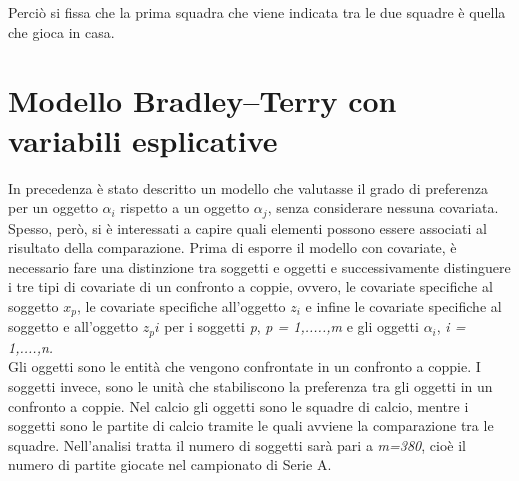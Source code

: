 Perciò si fissa che la prima squadra che viene indicata tra le due squadre è quella che gioca in casa.
\section{Modello Bradley–Terry con variabili esplicative}
In precedenza è stato descritto un modello che valutasse il grado di preferenza per un oggetto $\alpha_{i}$ rispetto a un oggetto $\alpha_{j}$, senza considerare nessuna covariata. Spesso, però, si è interessati a capire quali elementi possono essere associati al risultato della comparazione. Prima di esporre il modello con covariate, è necessario fare una distinzione tra soggetti e oggetti e successivamente distinguere i tre tipi di covariate di un confronto a coppie, ovvero, le covariate specifiche al soggetto $x_p$, le covariate specifiche all'oggetto $z_i$ e infine le covariate specifiche al soggetto e all'oggetto $z_pi$ per i soggetti \emph{p}, \emph{p = 1,.....,m} e gli oggetti $\alpha_{i}$, \emph{i = 1,....,n.}\\
Gli oggetti sono le entità che vengono confrontate in un confronto a coppie. I soggetti invece, sono le unità che stabiliscono la preferenza tra gli oggetti in un confronto a coppie. Nel calcio gli oggetti sono le squadre di calcio, mentre i soggetti sono le partite di calcio tramite le quali avviene la comparazione tra le squadre. Nell'analisi tratta il numero di soggetti sarà pari a \emph{m=380}, cioè il numero di partite giocate nel campionato di Serie A.
\\

